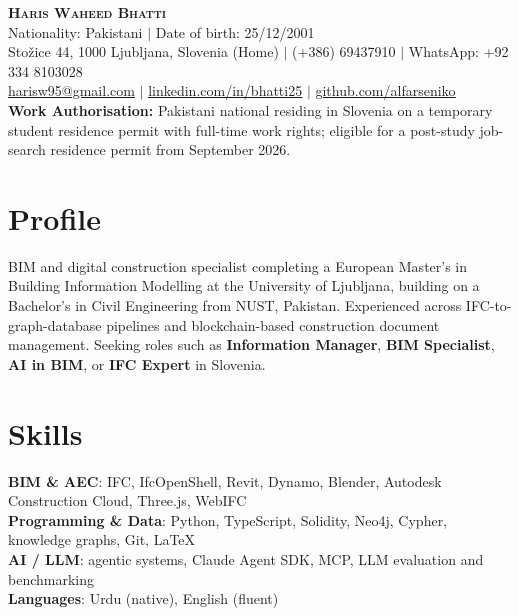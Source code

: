 \documentclass[a4paper,11pt]{article}
\begin{document}
\begin{center}
    \textbf{\Huge \scshape Haris Waheed Bhatti} \\ \vspace{4pt}
    \small Nationality: Pakistani $|$ Date of birth: 25/12/2001 \\ \vspace{2pt}
    \small Stožice 44, 1000 Ljubljana, Slovenia (Home) $|$ (+386) 69437910 $|$ WhatsApp: +92 334 8103028 \\ \vspace{2pt}
    \small \href{mailto:harisw95@gmail.com}{\underline{harisw95@gmail.com}} $|$
    \href{https://www.linkedin.com/in/bhatti25/}{\underline{linkedin.com/in/bhatti25}} $|$
    \href{https://github.com/alfarseniko}{\underline{github.com/alfarseniko}} \\ \vspace{4pt}
    \small \textbf{Work Authorisation:} Pakistani national residing in Slovenia on a temporary student residence permit with full-time work rights; eligible for a post-study job-search residence permit from September 2026.
\end{center}


\section{Profile}
    \small{BIM and digital construction specialist completing a European Master's in Building Information Modelling at the University of Ljubljana, building on a Bachelor's in Civil Engineering from NUST, Pakistan. Experienced across IFC-to-graph-database pipelines and blockchain-based construction document management. Seeking roles such as \textbf{Information Manager}, \textbf{BIM Specialist}, \textbf{AI in BIM}, or \textbf{IFC Expert} in Slovenia.}


\section{Skills}
 \begin{itemize}[leftmargin=0.15in, label={}]
    \small{\item{
     \textbf{BIM \& AEC}{: IFC, IfcOpenShell, Revit, Dynamo, Blender, Autodesk Construction Cloud, Three.js, WebIFC} \\
     \textbf{Programming \& Data}{: Python, TypeScript, Solidity, Neo4j, Cypher, knowledge graphs, Git, LaTeX} \\
     \textbf{AI / LLM}{: agentic systems, Claude Agent SDK, MCP, LLM evaluation and benchmarking} \\
     \textbf{Languages}{: Urdu (native), English (fluent)}
    }}
 \end{itemize}
\end{document}
